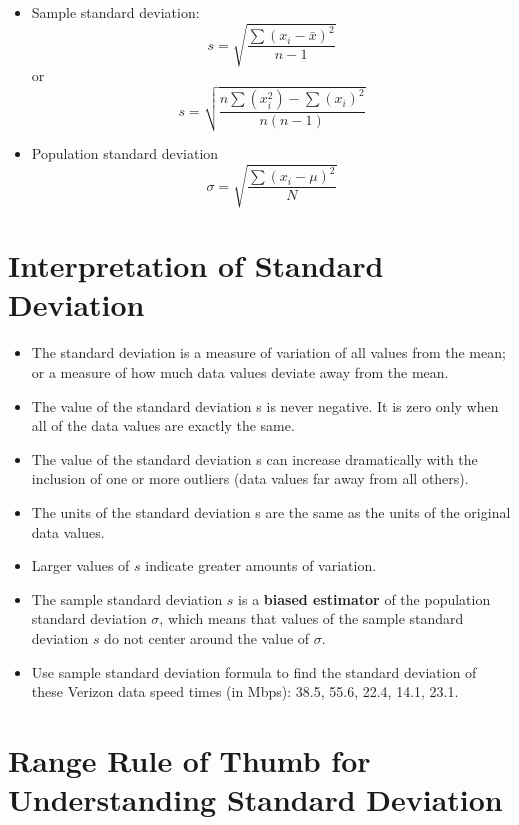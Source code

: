 \documentclass[]{book}
\providecommand{\tightlist}{%
  \setlength{\itemsep}{0pt}\setlength{\parskip}{0pt}}
\begin{document}
\begin{itemize}
\item
  Sample standard deviation:
  \[s=\sqrt{\frac{\sum (x_i-\bar{x})^2}{n-1}}\]
  or
  \[s=\sqrt{\frac{n\sum (x_i^2)-\sum(x_i)^2}{n(n-1)}}\]
\item
  Population standard deviation
  \[\sigma=\sqrt{\frac{\sum (x_i-\mu)^2}{N}}\]
\end{itemize}

\hypertarget{interpretation-of-standard-deviation}{%
\section{Interpretation of Standard Deviation}\label{interpretation-of-standard-deviation}}

\begin{itemize}
\tightlist
\item
  The standard deviation is a measure of variation of all values from the mean; or a measure of how much data values deviate away from the mean.
\item
  The value of the standard deviation s is never negative. It is zero only when all of the data values are exactly the same.
\item
  The value of the standard deviation s can increase dramatically with the inclusion of one or more outliers (data values far away from all others).
\item
  The units of the standard deviation s are the same as the units of the original data values.
\item
  Larger values of \(s\) indicate greater amounts of variation.
\item
  The sample standard deviation \(s\) is a \textbf{biased estimator} of the population standard deviation \(\sigma\), which means that values of the sample standard deviation \(s\) do not center around the value of \(\sigma\).
\item
  Use sample standard deviation formula to find the standard deviation of these Verizon data speed times (in Mbps): 38.5, 55.6, 22.4, 14.1, 23.1.
\end{itemize}

\hypertarget{range-rule-of-thumb-for-understanding-standard-deviation}{%
\section{Range Rule of Thumb for Understanding Standard Deviation}\label{range-rule-of-thumb-for-understanding-standard-deviation}}
\end{document}
